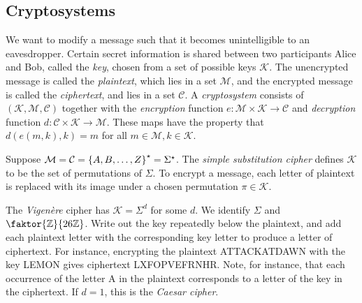 \subsection{Cryptosystems}
We want to modify a message such that it becomes unintelligible to an eavesdropper.
Certain secret information is shared between two participants Alice and Bob, called the \emph{key}, chosen from a set of possible keys \( \mathcal K \).
The unencrypted message is called the \emph{plaintext}, which lies in a set \( \mathcal M \), and the encrypted message is called the \emph{ciphertext}, and lies in a set \( \mathcal C \).
A \emph{cryptosystem} consists of \( (\mathcal K, \mathcal M, \mathcal C) \) together with the \emph{encryption} function \( e \colon \mathcal M \times \mathcal K \to \mathcal C \) and \emph{decryption} function \( d \colon \mathcal C \times \mathcal K \to \mathcal M \).
These maps have the property that \( d(e(m, k), k) = m \) for all \( m \in \mathcal M, k \in \mathcal K \).
\begin{example}
    Suppose \( \mathcal M = \mathcal C = \qty{A, B, \dots, Z}^\star = \Sigma^\star \).
    The \emph{simple substitution cipher} defines \( \mathcal K \) to be the set of permutations of \( \Sigma \).
    To encrypt a message, each letter of plaintext is replaced with its image under a chosen permutation \( \pi \in \mathcal K \).

    The \emph{Vigen\`ere} cipher has \( \mathcal K = \Sigma^d \) for some \( d \).
    We identify \( \Sigma \) and \( \faktor{\mathbb Z}{26\mathbb Z} \).
    Write out the key repeatedly below the plaintext, and add each plaintext letter with the corresponding key letter to produce a letter of ciphertext.
    For instance, encrypting the plaintext ATTACKATDAWN with the key LEMON gives ciphertext LXFOPVEFRNHR.
    Note, for instance, that each occurrence of the letter A in the plaintext corresponds to a letter of the key in the ciphertext.
    If \( d = 1 \), this is the \emph{Caesar cipher}.
\end{example}

